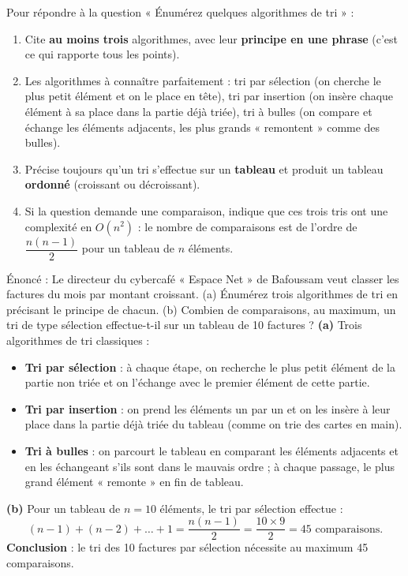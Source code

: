 \documentclass[11pt]{article}
\newcommand{\cle}[1]{{\popxbold\color{popdark}#1}}
\begin{document}
\begin{methode}
Pour répondre à la question « Énumérez quelques algorithmes de tri » :
\begin{enumerate}
  \item Cite \textbf{au moins trois} algorithmes, avec leur \textbf{principe en une phrase} (c'est ce qui rapporte tous les points).
  \item Les algorithmes à connaître parfaitement : \cle{tri par sélection} (on cherche le plus petit élément et on le place en tête), \cle{tri par insertion} (on insère chaque élément à sa place dans la partie déjà triée), \cle{tri à bulles} (on compare et échange les éléments adjacents, les plus grands « remontent » comme des bulles).
  \item Précise toujours qu'un tri s'effectue sur un \textbf{tableau} et produit un tableau \textbf{ordonné} (croissant ou décroissant).
  \item Si la question demande une comparaison, indique que ces trois tris ont une complexité en $O(n^2)$ : le nombre de comparaisons est de l'ordre de $\dfrac{n(n-1)}{2}$ pour un tableau de $n$ éléments.
\end{enumerate}
\end{methode}

\begin{exoresolu}
Énoncé : Le directeur du cybercafé « Espace Net » de Bafoussam veut classer les factures du mois par montant croissant. (a) Énumérez trois algorithmes de tri en précisant le principe de chacun. (b) Combien de comparaisons, au maximum, un tri de type sélection effectue-t-il sur un tableau de 10 factures ?
\tcblower
\textbf{(a)} Trois algorithmes de tri classiques :
\begin{itemize}
  \item \textbf{Tri par sélection} : à chaque étape, on recherche le plus petit élément de la partie non triée et on l'échange avec le premier élément de cette partie.
  \item \textbf{Tri par insertion} : on prend les éléments un par un et on les insère à leur place dans la partie déjà triée du tableau (comme on trie des cartes en main).
  \item \textbf{Tri à bulles} : on parcourt le tableau en comparant les éléments adjacents et en les échangeant s'ils sont dans le mauvais ordre ; à chaque passage, le plus grand élément « remonte » en fin de tableau.
\end{itemize}
\textbf{(b)} Pour un tableau de $n = 10$ éléments, le tri par sélection effectue :
\[ (n-1) + (n-2) + \dots + 1 = \frac{n(n-1)}{2} = \frac{10 \times 9}{2} = 45 \text{ comparaisons.} \]
\textbf{Conclusion} : le tri des 10 factures par sélection nécessite au maximum 45 comparaisons.
\end{exoresolu}
\end{document}
